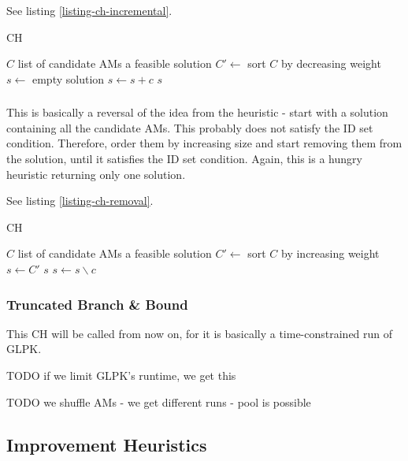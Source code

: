 See listing \ref{listing-ch-incremental}.

\begin{algorithm}
\caption{ CH}
\label{listing-ch-incremental}
\begin{algorithmic}
\REQUIRE $C$ list of candidate AMs
\ENSURE a feasible solution
\STATE $C' \gets $ sort $C$ by decreasing weight
\STATE $s \gets $ empty solution
    \STATE $s \gets s + c$
  \ENDIF
\ENDFOR
\RETURN $s$
\end{algorithmic}
\end{algorithm}

\subsubsection{}

This is basically a reversal of the idea from the  heuristic - start with a solution containing all the candidate AMs. This probably does not satisfy the ID set condition. Therefore, order them by increasing size and start removing them from the solution, until it satisfies the ID set condition. Again, this is a hungry heuristic returning only one solution.

See listing \ref{listing-ch-removal}.

\begin{algorithm}
\caption{ CH}
\label{listing-ch-removal}
\begin{algorithmic}
\REQUIRE $C$ list of candidate AMs
\ENSURE a feasible solution
\STATE $C' \gets $ sort $C$ by increasing weight
\STATE $s \gets C'$
    \RETURN $s$
  \ENDIF
  \STATE $s \gets s \backslash c$
\ENDFOR
\end{algorithmic}
\end{algorithm}

\subsubsection{Truncated Branch \& Bound}

This CH will be called  from now on, for it is basically a time-constrained run of GLPK.

TODO if we limit GLPK's runtime, we get this

TODO we shuffle AMs - we get different runs - pool is possible

\subsection{Improvement Heuristics}
\label{section-mip-ihs}

